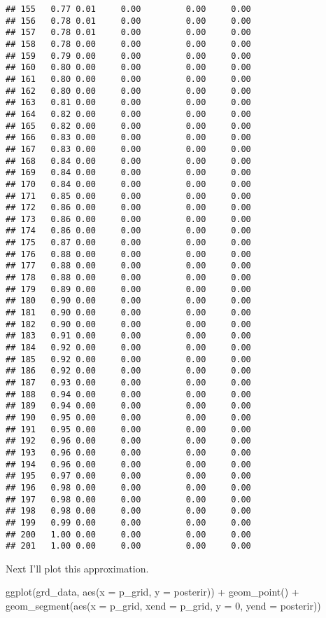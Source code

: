 \documentclass[
]{article}
\newenvironment{Shaded}{\begin{snugshade}}{\end{snugshade}}
\newcommand{\AttributeTok}[1]{\textcolor[rgb]{0.77,0.63,0.00}{#1}}
\newcommand{\DecValTok}[1]{\textcolor[rgb]{0.00,0.00,0.81}{#1}}
\newcommand{\FunctionTok}[1]{\textcolor[rgb]{0.00,0.00,0.00}{#1}}
\newcommand{\NormalTok}[1]{#1}
\newcommand{\SpecialCharTok}[1]{\textcolor[rgb]{0.00,0.00,0.00}{#1}}
\begin{document}
\begin{verbatim}
## 155   0.77 0.01     0.00         0.00     0.00
## 156   0.78 0.01     0.00         0.00     0.00
## 157   0.78 0.01     0.00         0.00     0.00
## 158   0.78 0.00     0.00         0.00     0.00
## 159   0.79 0.00     0.00         0.00     0.00
## 160   0.80 0.00     0.00         0.00     0.00
## 161   0.80 0.00     0.00         0.00     0.00
## 162   0.80 0.00     0.00         0.00     0.00
## 163   0.81 0.00     0.00         0.00     0.00
## 164   0.82 0.00     0.00         0.00     0.00
## 165   0.82 0.00     0.00         0.00     0.00
## 166   0.83 0.00     0.00         0.00     0.00
## 167   0.83 0.00     0.00         0.00     0.00
## 168   0.84 0.00     0.00         0.00     0.00
## 169   0.84 0.00     0.00         0.00     0.00
## 170   0.84 0.00     0.00         0.00     0.00
## 171   0.85 0.00     0.00         0.00     0.00
## 172   0.86 0.00     0.00         0.00     0.00
## 173   0.86 0.00     0.00         0.00     0.00
## 174   0.86 0.00     0.00         0.00     0.00
## 175   0.87 0.00     0.00         0.00     0.00
## 176   0.88 0.00     0.00         0.00     0.00
## 177   0.88 0.00     0.00         0.00     0.00
## 178   0.88 0.00     0.00         0.00     0.00
## 179   0.89 0.00     0.00         0.00     0.00
## 180   0.90 0.00     0.00         0.00     0.00
## 181   0.90 0.00     0.00         0.00     0.00
## 182   0.90 0.00     0.00         0.00     0.00
## 183   0.91 0.00     0.00         0.00     0.00
## 184   0.92 0.00     0.00         0.00     0.00
## 185   0.92 0.00     0.00         0.00     0.00
## 186   0.92 0.00     0.00         0.00     0.00
## 187   0.93 0.00     0.00         0.00     0.00
## 188   0.94 0.00     0.00         0.00     0.00
## 189   0.94 0.00     0.00         0.00     0.00
## 190   0.95 0.00     0.00         0.00     0.00
## 191   0.95 0.00     0.00         0.00     0.00
## 192   0.96 0.00     0.00         0.00     0.00
## 193   0.96 0.00     0.00         0.00     0.00
## 194   0.96 0.00     0.00         0.00     0.00
## 195   0.97 0.00     0.00         0.00     0.00
## 196   0.98 0.00     0.00         0.00     0.00
## 197   0.98 0.00     0.00         0.00     0.00
## 198   0.98 0.00     0.00         0.00     0.00
## 199   0.99 0.00     0.00         0.00     0.00
## 200   1.00 0.00     0.00         0.00     0.00
## 201   1.00 0.00     0.00         0.00     0.00
\end{verbatim}

Next I'll plot this approximation.

\begin{Shaded}
\begin{Highlighting}[]
\FunctionTok{ggplot}\NormalTok{(grd\_data, }\FunctionTok{aes}\NormalTok{(}\AttributeTok{x =}\NormalTok{ p\_grid, }\AttributeTok{y =}\NormalTok{ posterir)) }\SpecialCharTok{+} 
  \FunctionTok{geom\_point}\NormalTok{() }\SpecialCharTok{+} 
  \FunctionTok{geom\_segment}\NormalTok{(}\FunctionTok{aes}\NormalTok{(}\AttributeTok{x =}\NormalTok{ p\_grid, }\AttributeTok{xend =}\NormalTok{ p\_grid, }\AttributeTok{y =} \DecValTok{0}\NormalTok{, }\AttributeTok{yend =}\NormalTok{ posterir))}
\end{Highlighting}
\end{Shaded}
\end{document}
